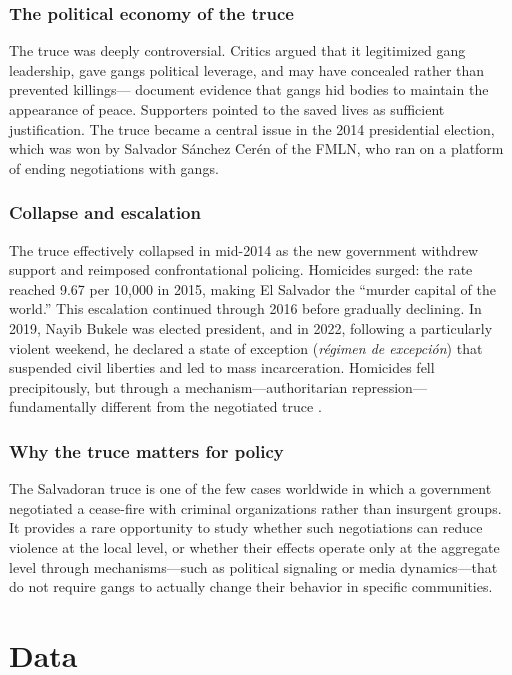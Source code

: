\documentclass[12pt]{article}
\begin{document}
\subsubsection*{The political economy of the truce} The truce was deeply controversial. Critics argued that it legitimized gang leadership, gave gangs political leverage, and may have concealed rather than prevented killings---\citet{cruz_duran2016} document evidence that gangs hid bodies to maintain the appearance of peace. Supporters pointed to the saved lives as sufficient justification. The truce became a central issue in the 2014 presidential election, which was won by Salvador S\'anchez Cer\'en of the FMLN, who ran on a platform of ending negotiations with gangs.

\subsubsection*{Collapse and escalation} The truce effectively collapsed in mid-2014 as the new government withdrew support and reimposed confrontational policing. Homicides surged: the rate reached 9.67 per 10,000 in 2015, making El Salvador the ``murder capital of the world.'' This escalation continued through 2016 before gradually declining. In 2019, Nayib Bukele was elected president, and in 2022, following a particularly violent weekend, he declared a state of exception (\textit{r\'egimen de excepci\'on}) that suspended civil liberties and led to mass incarceration. Homicides fell precipitously, but through a mechanism---authoritarian repression---fundamentally different from the negotiated truce \citep{lessing2017}.

\subsubsection*{Why the truce matters for policy} The Salvadoran truce is one of the few cases worldwide in which a government negotiated a cease-fire with criminal organizations rather than insurgent groups. It provides a rare opportunity to study whether such negotiations can reduce violence at the local level, or whether their effects operate only at the aggregate level through mechanisms---such as political signaling or media dynamics---that do not require gangs to actually change their behavior in specific communities.


\section{Data}
\end{document}
